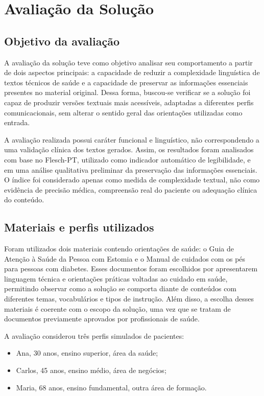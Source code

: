 \chapter{Avaliação da Solução}
\label{cap:avaliacao}

\section{Objetivo da avaliação}
\label{sec:objetivo-avaliacao}

A avaliação da solução teve como objetivo analisar seu comportamento a partir de dois aspectos principais: a capacidade de reduzir a complexidade linguística de textos técnicos de saúde e a capacidade de preservar as informações essenciais presentes no material original. Dessa forma, buscou-se verificar se a solução foi capaz de produzir versões textuais mais acessíveis, adaptadas a diferentes perfis comunicacionais, sem alterar o sentido geral das orientações utilizadas como entrada.

A avaliação realizada possui caráter funcional e linguístico, não correspondendo a uma validação clínica dos textos gerados. Assim, os resultados foram analisados com base no Flesch-PT, utilizado como indicador automático de legibilidade, e em uma análise qualitativa preliminar da preservação das informações essenciais. O índice foi considerado apenas como medida de complexidade textual, não como evidência de precisão médica, compreensão real do paciente ou adequação clínica do conteúdo.

\section{Materiais e perfis utilizados}
\label{sec:materiais-perfis-utilizados}

Foram utilizados dois materiais contendo orientações de saúde: o Guia de Atenção à Saúde da Pessoa com Estomia e o Manual de cuidados com os pés para pessoas com diabetes. Esses documentos foram escolhidos por apresentarem linguagem técnica e orientações práticas voltadas ao cuidado em saúde, permitindo observar como a solução se comporta diante de conteúdos com diferentes temas, vocabulários e tipos de instrução. Além disso, a escolha desses materiais é coerente com o escopo da solução, uma vez que se tratam de documentos previamente aprovados por profissionais de saúde.

A avaliação considerou três perfis simulados de pacientes:

\begin{itemize}
  \item Ana, 30 anos, ensino superior, área da saúde;
  \item Carlos, 45 anos, ensino médio, área de negócios;
  \item Maria, 68 anos, ensino fundamental, outra área de formação.
\end{itemize}


